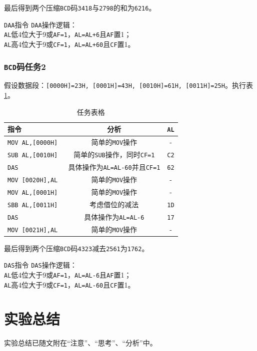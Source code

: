 \documentclass[11pt]{SEU-Digital-Report}
\newcommand{\grayrow}{\rowcolor[rgb]{ .906, .902, .902}}
\begin{document}
最后得到两个压缩\texttt{BCD}码\texttt{3418}与\texttt{2798}的和为\texttt{6216}。

\begin{analyze}{\texttt{DAA}指令}{}
    \texttt{DAA}操作逻辑：\\
    \texttt{AL}低4位大于9或\texttt{AF=1}，\texttt{AL=AL+6}且\texttt{AF}置1；\\
    \texttt{AL}高4位大于9或\texttt{CF=1}，\texttt{AL=AL+60}且\texttt{CF}置1。
\end{analyze}

\subsubsection{\texttt{BCD}码任务2}
假设数据段：\texttt{[0000H]=23H, [0001H]=43H, [0010H]=61H, [0011H]=25H}。执行表 \ref{tab:task6.2}。
\begin{table}[htbp]
    \centering
    \caption{任务表格\label{tab:task6.2}}
    \bgroup{}
    \setlength{\tabcolsep}{4.5mm}
        \begin{tabular}{l|c|c}
          \toprule
          \textbf{指令} & \textbf{分析} & \texttt{AL}\\
          \midrule\midrule
          \grayrow  \texttt{MOV AL,[0000H]} & 简单的\texttt{MOV}操作 & -\\
                    \texttt{SUB AL,[0010H] } & 简单的\texttt{SUB}操作，同时\texttt{CF=1}& \texttt{C2}\\
          \grayrow  \texttt{DAS} & 具体操作为\texttt{AL=AL-60}并且\texttt{CF=1} & \texttt{62}\\
                    \texttt{MOV [0020H],AL}& 简单的\texttt{MOV}操作 & -\\
          \grayrow  \texttt{MOV AL,[0001H]} & 简单的\texttt{MOV}操作 & -\\
                    \texttt{SBB AL,[0011H]} & 考虑借位的减法 & \texttt{1D}\\
          \grayrow  \texttt{DAS} & 具体操作为\texttt{AL=AL-6} & \texttt{17}\\
                    \texttt{MOV [0021H],AL} & 简单的\texttt{MOV}操作 & -\\
          \bottomrule
        \end{tabular}
    \egroup
\end{table}

最后得到两个压缩\texttt{BCD}码\texttt{4323}减去\texttt{2561}为\texttt{1762}。

\begin{analyze}{\texttt{DAS}指令}{}
    \texttt{DAS}操作逻辑：\\
    \texttt{AL}低4位大于9或\texttt{AF=1}，\texttt{AL=AL-6}且\texttt{AF}置1；\\
    \texttt{AL}高4位大于9或\texttt{CF=1}，\texttt{AL=AL-60}且\texttt{CF}置1。
\end{analyze}

\section{实验总结}
实验总结已随文附在“注意”、“思考”、“分析”中。

\printbibliography
\end{document}
